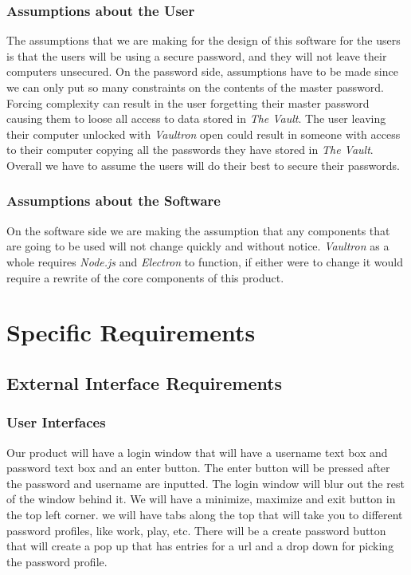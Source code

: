\documentclass[11pt]{report}
\begin{document}
\subsection{Assumptions about the User}
The assumptions that we are making for the design of this software for the users is
that the users will be using a secure password, and they will not leave
their computers unsecured. On the password side, assumptions have to be
made since we can only put so many constraints on the contents of the
master password. Forcing complexity can result in the user forgetting 
their master password causing them to loose all access to data stored in
\textit{The Vault}. The user leaving their computer unlocked with 
\textit{Vaultron} open could result in someone with access to their computer
copying all the passwords they have stored in \textit{The Vault}. Overall
we have to assume the users will do their best to secure their passwords.


\subsection{Assumptions about the Software}
On the software side we are making the assumption that any components that are
going to be used will not change quickly and without notice. \textit{Vaultron} 
as a whole requires \textit{Node.js} and \textit{Electron} to function, if 
either were to change it would require a rewrite of the core components of 
this product.



\chapter{Specific Requirements}

\section{External Interface Requirements}

\subsection{User Interfaces}
Our product will have a login window that will have a username text box and password
text box and an enter button. The enter button will be pressed after the password 
and username are inputted. The login window will blur out the rest of the window
behind it.
We will have a minimize, maximize  and exit button in the top left corner. 
we will have tabs along the top that will take you to different password profiles,
like work, play, etc. 
There will be a create password button that will create a pop up that has entries
for a url and a drop down for picking the password profile. 
\end{document}
